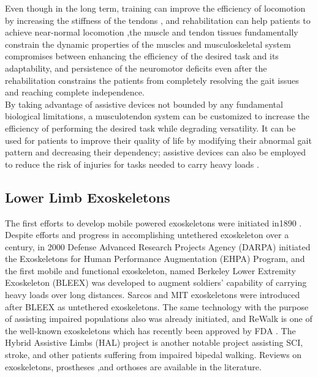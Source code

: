 \documentclass[10pt,letterpaper]{article}
\begin{document}
Even though in the long term, training can improve the efficiency of locomotion\cite{5} by increasing the stiffness of the tendons \cite{6}, and rehabilitation can help patients to achieve near-normal locomotion \cite{22},the muscle and tendon tissues fundamentally constrain the dynamic properties of the muscles and musculoskeletal system compromises between enhancing the efficiency of the desired task and its adaptability\cite{2}, and persistence of the neuromotor deficits even after the rehabilitation constrains \cite{22} the patients from completely resolving the gait issues and reaching complete independence.\\
By taking advantage of assistive devices not bounded by any fundamental biological limitations, a musculotendon system can be customized to increase the efficiency of performing the desired task while degrading versatility. It can be used for patients to improve their quality of life by modifying their abnormal gait pattern and decreasing their dependency; assistive devices  can also be employed to reduce the risk of injuries for tasks needed to carry heavy loads \cite{27,28,29}.\\
\subsection*{Lower Limb Exoskeletons}
The first efforts to develop mobile powered exoskeletons were initiated in1890 \cite{30}. Despite efforts and progress in accomplishing untethered exoskeleton over a century\cite{31}, in 2000 Defense Advanced Research Projects Agency (DARPA) initiated the Exoskeletons for Human Performance Augmentation (EHPA) Program\cite{32}, and the first mobile and functional exoskeleton, named Berkeley Lower Extremity Exoskeleton (BLEEX) was developed to augment soldiers' capability of carrying heavy loads over long distances\cite{33}. Sarcos and MIT exoskeletons were introduced\cite{30} after BLEEX as untethered exoskeletons. The same technology with the purpose of assisting impaired populations also was already initiated\cite{34}, and ReWalk is one of the well-known exoskeletons \cite{35} which has recently been approved by FDA \cite{36}. The Hybrid Assistive Limbs (HAL) project\cite{37} is another notable project assisting SCI, stroke, and other patients suffering from impaired bipedal walking. Reviews on exoskeletons, prostheses ,and orthoses are available in the literature\cite{31,36,37,38,39}.\\
\end{document}
